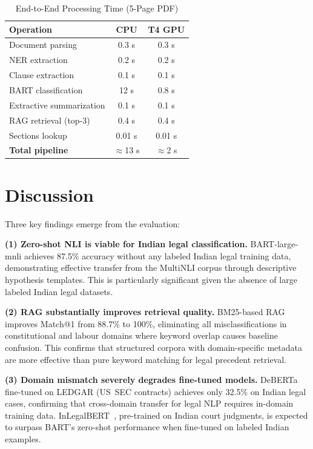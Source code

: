 \documentclass[conference]{IEEEtran}
\begin{document}
\begin{table}[ht]
\centering
\caption{End-to-End Processing Time (5-Page PDF)}
\label{tab:timing}
\renewcommand{\arraystretch}{1.1}
\begin{tabular}{lcc}
\toprule
\textbf{Operation} & \textbf{CPU} & \textbf{T4 GPU} \\
\midrule
Document parsing        & 0.3 s  & 0.3 s  \\
NER extraction          & 0.2 s  & 0.2 s  \\
Clause extraction       & 0.1 s  & 0.1 s  \\
BART classification     & 12 s   & 0.8 s  \\
Extractive summarization& 0.1 s  & 0.1 s  \\
RAG retrieval (top-3)   & 0.4 s  & 0.4 s  \\
Sections lookup         & 0.01 s & 0.01 s \\
\midrule
\textbf{Total pipeline} & $\approx$13 s & $\approx$2 s \\
\bottomrule
\end{tabular}
\end{table}

\section{Discussion}

Three key findings emerge from the evaluation:

\textbf{(1) Zero-shot NLI is viable for Indian legal classification.}
BART-large-mnli achieves 87.5\% accuracy without any labeled Indian legal
training data, demonstrating effective transfer from the MultiNLI corpus
through descriptive hypothesis templates. This is particularly significant
given the absence of large labeled Indian legal datasets.

\textbf{(2) RAG substantially improves retrieval quality.}
BM25-based RAG improves Match@1 from 88.7\% to 100\%, eliminating all
misclassifications in constitutional and labour domains where keyword
overlap causes baseline confusion. This confirms that structured corpora
with domain-specific metadata are more effective than pure keyword matching
for legal precedent retrieval.

\textbf{(3) Domain mismatch severely degrades fine-tuned models.}
DeBERTa fine-tuned on LEDGAR (US~SEC contracts) achieves only 32.5\% on
Indian legal cases, confirming that cross-domain transfer for legal NLP
requires in-domain training data. InLegalBERT~\cite{malik2021ildc},
pre-trained on Indian court judgments, is expected to surpass BART's
zero-shot performance when fine-tuned on labeled Indian examples.
\end{document}
